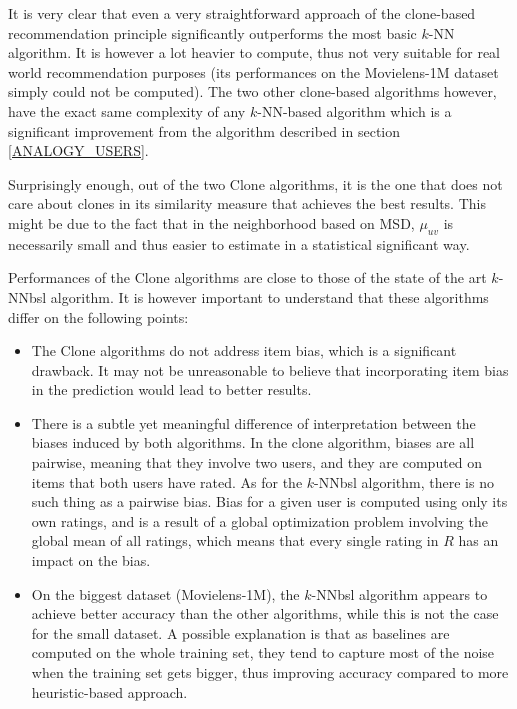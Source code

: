 It is very clear that even a very straightforward approach of the clone-based
recommendation principle significantly outperforms the most basic $k$-NN
algorithm. It is however a lot heavier to compute, thus not very suitable for
real world recommendation purposes (its performances on the Movielens-1M
dataset simply could not be computed). The two other clone-based algorithms
however, have the exact same complexity of any $k$-NN-based algorithm which is
a significant improvement from the algorithm described in section
\ref{ANALOGY_USERS}.

Surprisingly enough, out of the two Clone algorithms, it is the one that does
not care about clones in its similarity measure that achieves the best results.
This might be due to the fact that in the neighborhood based on MSD, $\mu_{uv}$
is necessarily small and thus easier to estimate in a statistical significant
way.

Performances of the Clone algorithms are close to those of the state of the
art $k$-NNbsl algorithm. It is however important to understand that these
algorithms differ on the following points:
\begin{itemize}
\item The Clone algorithms do not address item bias, which is a significant
  drawback. It may not be unreasonable to believe that incorporating item bias
  in the prediction would lead to better results.
\item There is a subtle yet meaningful difference of interpretation between the
  biases induced by both algorithms. In the clone algorithm, biases are all
  pairwise, meaning that they involve two users, and they are computed on items
  that both users have rated. As for the $k$-NNbsl algorithm, there is no such
  thing as a pairwise bias. Bias for a given user is computed using only its
  own ratings, and is a result of a global optimization problem involving the
  global mean of all ratings, which means that every single rating in $R$ has
  an impact on the bias.
\item On the biggest dataset (Movielens-1M), the $k$-NNbsl algorithm appears to
  achieve better accuracy than the other algorithms, while this is not the case
  for the small dataset. A possible explanation is that as baselines are
  computed on the whole training set, they tend to capture most of the noise
  when the training set gets bigger, thus improving accuracy compared to more
  heuristic-based approach.
\end{itemize}

